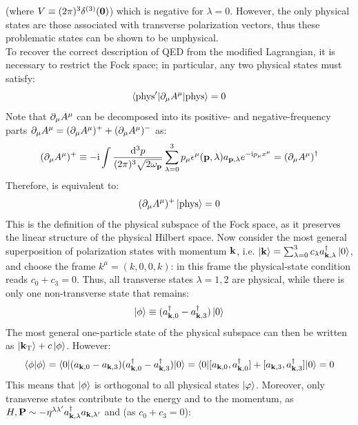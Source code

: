 (where $ V \equiv (2\pi)^3 \delta^{(3)}(\mathbf{0}) $) which is negative for $ \lambda = 0 $. However, the only physical states are those associated with transverse polarization vectors, thus these problematic states can be shown to be unphysical. \\
To recover the correct description of QED from the modified Lagrangian, it is necessary to restrict the Fock space; in particular, any two physical states must satisfy:
\begin{equation}
  \braket{\text{phys}' | \partial_\mu A^\mu | \text{phys}} = 0
  \label{eq:qed-phys-cond-1}
\end{equation}
Note that $ \partial_\mu A^\mu $ can be decomposed into its positive- and negative-frequency parts $ \partial_\mu A^\mu = (\partial_\mu A^\mu)^+ + (\partial_\mu A^\mu)^- $ as:
\begin{equation*}
  (\partial_\mu A^\mu)^+ \equiv -\mathrm{i} \int \frac{\mathrm{d}^3p}{(2\pi)^3 \sqrt{2\omega_{\mathbf{p}}}} \sum_{\lambda = 0}^{3} p_\mu \epsilon^\mu(\mathbf{p},\lambda) a_{\mathbf{p},\lambda} e^{-\mathrm{i} p_\mu x^\mu} = {(\partial_\mu A^\mu)}^\dagger
\end{equation*}
Therefore,  is equivalent to:
\begin{equation}
  (\partial_\mu A^\mu)^+ \ket{\text{phys}} = 0
\end{equation}
This is the definition of the physical subspace of the Fock space, as it preserves the linear structure of the physical Hilbert space. Now consider the most general superposition of polarization states with momentum $ \mathbf{k} $, i.e. $ \ket{\mathbf{k}} = \sum_{\lambda = 0}^{3} c_\lambda a_{\mathbf{k},\lambda}^\dagger \ket{0} $, and choose the frame $ k^\mu = (k,0,0,k) $: in this frame the physical-state condition reads $ c_0 + c_3 = 0 $. Thus, all transverse states $ \lambda = 1,2 $ are physical, while there is only one non-transverse state that remains:
\begin{equation*}
  \ket{\phi} \equiv (a_{\mathbf{k},0}^\dagger - a_{\mathbf{k},3}^\dagger) \ket{0}
\end{equation*}
The most general one-particle state of the physical subspace can then be written as $ \ket{\mathbf{k}_\text{T}} + c \ket{\phi} $. However:
\begin{equation*}
  \braket{\phi | \phi} = \braket{0 | (a_{\mathbf{k},0} - a_{\mathbf{k},3}) (a_{\mathbf{k},0}^\dagger - a_{\mathbf{k},3}^\dagger) | 0} = \braket{0 | [a_{\mathbf{k},0} , a_{\mathbf{k},0}^\dagger] + [a_{\mathbf{k},3} , a_{\mathbf{k},3}^\dagger] | 0} = 0
\end{equation*}
This means that $ \ket{\phi} $ is orthogonal to all physical states $ \ket{\varphi} $. Moreover, only transverse states contribute to the energy and to the momentum, as $ H , \mathbf{P} \sim - \eta^{\lambda \lambda'} a_{\mathbf{k},\lambda}^\dagger a_{\mathbf{k},\lambda'} $ and (as $ c_0 + c_3 = 0 $):
